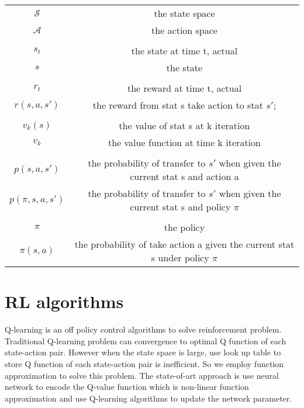 \documentclass[10pt,a4paper]{article}
\theoremstyle{definition}
\theoremstyle{remark}
\begin{document}
	\begin{center}
		\begin{tabular}{ |c  c| } 
			\hline
			$ \mathcal{S} $ &    the state space \\ 
			$ \mathcal{A} $& the action space\\
			&\\
		
			$ s_t $ &    the state at time t, actual  \\ 
			$ s $ & the state\\
			&\\
			
		
			$ r_t $ & the reward at time t, actual\\
			$ r(s,a,s') $ & the reward from stat s take action to stat $s'$;\\
			&\\
			$ v_k(s) $ & the value of stat s at k iteration\\ 
			$ v_k $ & the value function at time k iteration\\
			
			&\\
			$p(s,a,s')$& the probability of transfer to $s'$ when given the current stat s and action a\\
				
			$p(\pi,s,a,s')$&the probability of transfer to $s'$ when given the current stat s and policy $\pi$\\	
			
			&\\
			
			$\pi$& the policy\\
			$\pi(s,a)$& the probability of take action a given the current stat s under policy $\pi$\\
			
			
			\hline
		\end{tabular}
	\end{center}
	
	
	
	
	
	
	\section{RL algorithms}
	\label{algorithms}
	Q-learning is an off policy control algorithms to solve reinforcement problem. Traditional Q-learning problem can convergence to optimal Q function of each state-action pair. However when the state space is large, use look up table to store Q function of each state-action pair is inefficient. So we employ function approximation to solve this problem. The state-of-art approach is use  neural network to encode the Q-value function which is non-linear function approximation and use Q-learning algorithms to update the network parameter. 
	
\end{document}
